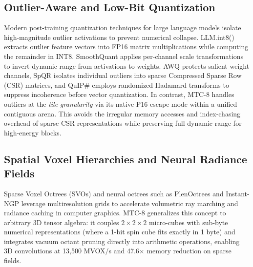 \documentclass[11pt,a4paper]{article}
\begin{document}
\subsection{Outlier-Aware and Low-Bit Quantization}
Modern post-training quantization techniques for large language models isolate high-magnitude outlier activations to prevent numerical collapse. LLM.int8() \cite{dettmers2022llm} extracts outlier feature vectors into FP16 matrix multiplications while computing the remainder in INT8. SmoothQuant \cite{xiao2023smoothquant} applies per-channel scale transformations to invert dynamic range from activations to weights. AWQ \cite{lin2023awq} protects salient weight channels, SpQR \cite{dettmers2023spqr} isolates individual outliers into sparse Compressed Sparse Row (CSR) matrices, and QuIP\# \cite{tseng2024quip} employs randomized Hadamard transforms to suppress incoherence before vector quantization.
In contrast, MTC-8 handles outliers at the \emph{tile granularity} via its native P16 escape mode within a unified contiguous arena. This avoids the irregular memory accesses and index-chasing overhead of sparse CSR representations while preserving full dynamic range for high-energy blocks.

\subsection{Spatial Voxel Hierarchies and Neural Radiance Fields}
Sparse Voxel Octrees (SVOs) \cite{laine2010efficient} and neural octrees such as PlenOctrees \cite{yu2021plenoctrees} and Instant-NGP \cite{muller2022instant} leverage multiresolution grids to accelerate volumetric ray marching and radiance caching in computer graphics.
MTC-8 generalizes this concept to arbitrary 3D tensor algebra: it couples $2\times 2\times 2$ micro-cubes with sub-byte numerical representations (where a 1-bit spin cube fits exactly in 1 byte) and integrates vacuum octant pruning directly into arithmetic operations, enabling 3D convolutions at 13,500 MVOX/s and 47.6$\times$ memory reduction on sparse fields.
\end{document}

